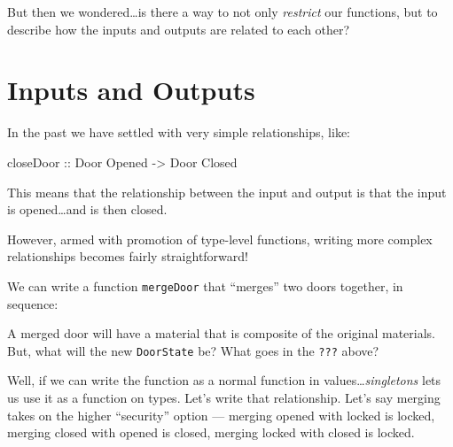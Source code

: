 \documentclass[]{article}
\newenvironment{Shaded}{}{}
\newcommand{\DataTypeTok}[1]{\textcolor[rgb]{0.56,0.13,0.00}{#1}}
\newcommand{\NormalTok}[1]{#1}
\newcommand{\OperatorTok}[1]{\textcolor[rgb]{0.40,0.40,0.40}{#1}}
\newcommand{\OtherTok}[1]{\textcolor[rgb]{0.00,0.44,0.13}{#1}}
\newcommand{\StringTok}[1]{\textcolor[rgb]{0.25,0.44,0.63}{#1}}
\begin{document}
But then we wondered\ldots is there a way to not only \emph{restrict} our
functions, but to describe how the inputs and outputs are related to each other?

\hypertarget{inputs-and-outputs}{%
\section{Inputs and Outputs}\label{inputs-and-outputs}}

In the past we have settled with very simple relationships, like:

\begin{Shaded}
\begin{Highlighting}[]
\OtherTok{closeDoor ::} \DataTypeTok{Door} \DataTypeTok{\textquotesingle{}Opened} \OtherTok{{-}>} \DataTypeTok{Door} \DataTypeTok{\textquotesingle{}Closed}
\end{Highlighting}
\end{Shaded}

This means that the relationship between the input and output is that the input
is opened\ldots and is then closed.

However, armed with promotion of type-level functions, writing more complex
relationships becomes fairly straightforward!

We can write a function \texttt{mergeDoor} that ``merges'' two doors together,
in sequence:

\begin{Shaded}
\end{Shaded}

A merged door will have a material that is composite of the original materials.
But, what will the new \texttt{DoorState} be? What goes in the \texttt{???}
above?

Well, if we can write the function as a normal function in
values\ldots{}\emph{singletons} lets us use it as a function on types. Let's
write that relationship. Let's say merging takes on the higher ``security''
option --- merging opened with locked is locked, merging closed with opened is
closed, merging locked with closed is locked.
\end{document}
